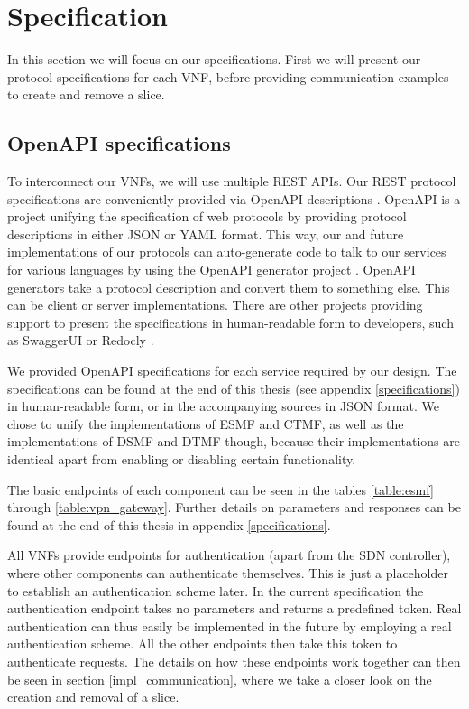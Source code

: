 \section{Specification}
\label{impl_specification}
In this section we will focus on our specifications. First we will present our protocol specifications for each VNF, before providing communication examples to create and remove a slice.

\subsection{OpenAPI specifications}
To interconnect our VNFs, we will  use multiple REST APIs. Our REST protocol specifications are conveniently provided via OpenAPI descriptions \cite{openapi}. OpenAPI is a project unifying the specification of web protocols by providing protocol descriptions in either JSON or YAML format. This way, our and future implementations of our protocols can auto-generate code to talk to our services for various languages by using the OpenAPI generator project \cite{openapi-generator}. OpenAPI generators take a protocol description and convert them to something else. This can be client or server implementations. There are other projects providing support to present the specifications in human-readable form to developers, such as SwaggerUI \cite{swaggerui} or Redocly \cite{redocly}.

We provided  OpenAPI specifications for each service required by our design. The specifications can be found at the end of this thesis (see appendix \ref{specifications}) in human-readable form, or in the accompanying sources in JSON format. We chose to unify the implementations of ESMF and CTMF, as well as the implementations of DSMF and DTMF though, because their implementations are identical apart from enabling or disabling certain functionality.

The basic endpoints of each component can be seen in the tables \ref{table:esmf} through \ref{table:vpn_gateway}. Further details on parameters and responses can be found at the end of this thesis in appendix \ref{specifications}.

All VNFs provide endpoints for authentication (apart from the SDN controller), where other components can authenticate themselves. This is just a placeholder to establish an authentication scheme later. In the current specification the authentication endpoint takes no parameters and returns a predefined token. Real authentication can thus easily be implemented in the future by employing a real authentication scheme. All the other endpoints then take this token to authenticate requests. The details on how these endpoints work together can then be seen in section \ref{impl_communication}, where we take a closer look on the creation and removal of a slice.


